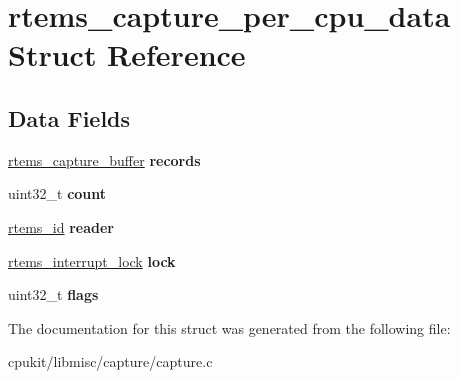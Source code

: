 \hypertarget{structrtems__capture__per__cpu__data}{}\section{rtems\+\_\+capture\+\_\+per\+\_\+cpu\+\_\+data Struct Reference}
\label{structrtems__capture__per__cpu__data}
\subsection*{Data Fields}
\begin{DoxyCompactItemize}
\item 
\mbox{\label{structrtems__capture__per__cpu__data_a507874c297aaa8755e593ae8db29aa21}} 
\mbox{\hyperlink{structrtems__capture__buffer}{rtems\+\_\+capture\+\_\+buffer}} {\bfseries records}
\item 
\mbox{\label{structrtems__capture__per__cpu__data_a85bf8be25922014de7812d599c3dbf8e}} 
uint32\+\_\+t {\bfseries count}
\item 
\mbox{\label{structrtems__capture__per__cpu__data_a8a41e17b0320155273056df7793aed47}} 
\mbox{\hyperlink{group__ClassicTasks_gab20892b814dced7dd4e5b9bf42becd57}{rtems\+\_\+id}} {\bfseries reader}
\item 
\mbox{\label{structrtems__capture__per__cpu__data_a39e56f85e9fb82f0f423e1a342cd1c75}} 
\mbox{\hyperlink{group__ClassicINTRLocks_ga7d4b54b01fd1507aa842d5fbc7b11177}{rtems\+\_\+interrupt\+\_\+lock}} {\bfseries lock}
\item 
\mbox{\label{structrtems__capture__per__cpu__data_a0aaafc30096e993b30bfc3fae14820af}} 
uint32\+\_\+t {\bfseries flags}
\end{DoxyCompactItemize}


The documentation for this struct was generated from the following file\+:\begin{DoxyCompactItemize}
\item 
cpukit/libmisc/capture/capture.\+c\end{DoxyCompactItemize}
